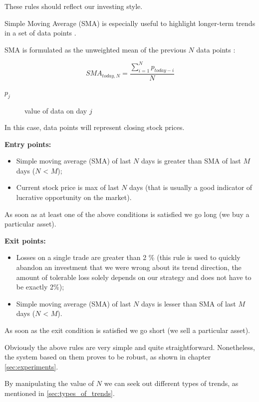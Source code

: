 These rules should reflect our investing style.

Simple Moving Average (SMA) is especially useful to highlight longer-term trends in a set of data points \cite{Trend01}.

SMA is formulated as the unweighted mean of the previous $N$ data points \cite{Trend01}:

\begin{equation}
    SMA_{today,N} = \frac{\sum_{i=1}^{N}p_{today - i}}{N}
\end{equation}

\begin{description}
  \item [$p_{j}$] 
    value of data on day $j$
\end{description}

In this case, data points will represent closing stock prices. 
 


\textbf{Entry points:}
  \begin{itemize}
    \item Simple moving average (SMA) of last $N$ days is greater than SMA of last $M$ days ($N$ < $M$);
    \item Current stock price is max of last $N$ days (that is usually a good indicator of lucrative opportunity on the market).
  \end{itemize}

As soon as at least one of the above conditions is satisfied we go long (we buy a particular asset).


\textbf{Exit points:}
  \begin{itemize}
    \item Losses on a single trade are greater than 2 \% (this rule is used to quickly abandon an investment that we were wrong about its trend direction,
	  the amount of tolerable loss solely depends on our strategy and does not have to be exactly 2\%);
    \item Simple moving average (SMA) of last $N$ days is lesser than SMA of last $M$ days ($N$ < $M$).
  \end{itemize}

As soon as the exit condition is satisfied we go short (we sell a particular asset).
 
Obviously the above rules are very simple and quite straightforward.
Nonetheless, the system based on them proves to be robust, as shown in chapter \ref{sec:experiments}.
   
By manipulating the value of $N$ we can seek out different types of trends, as mentioned in \ref{sec:types_of_trends}. 

